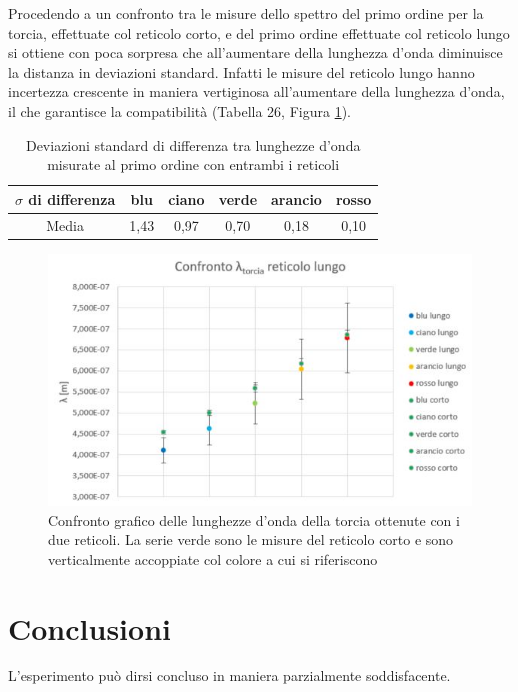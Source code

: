 \documentclass{article}
\begin{document}
Procedendo a un confronto tra le misure dello spettro del primo ordine per la torcia, effettuate col reticolo corto, e del primo ordine effettuate col reticolo lungo si ottiene con poca sorpresa che all'aumentare della lunghezza d'onda diminuisce la distanza in deviazioni standard. Infatti le misure del reticolo lungo hanno incertezza crescente in maniera vertiginosa all'aumentare della lunghezza d'onda, il che garantisce la compatibilità (Tabella 26, Figura \ref{confrontotraidue}).

\begin{table}[h]
    \centering
\begin{tabular}{||c|c|c|c|c|c||}
    \hline
     $\sigma$ di differenza & \cellcolor{blue}blu& \cellcolor{cyan}ciano  & \cellcolor{green}verde & \cellcolor{orange}arancio & \cellcolor{red}rosso \\
    \hline
    Media & 1,43 & 0,97 & 0,70 & 0,18 & 0,10 \\
    \hline
\end{tabular}
\caption{Deviazioni standard di differenza tra lunghezze d'onda misurate al primo ordine con entrambi i reticoli}
\end{table}

\begin{figure}
    \centering
    \includegraphics[width=0.6\linewidth]{Confronto_graph.JPG}
    \caption{Confronto grafico delle lunghezze d'onda della torcia ottenute con i due reticoli. La serie verde sono le misure del reticolo corto e sono verticalmente accoppiate col colore a cui si riferiscono}
    \label{confrontotraidue}
\end{figure}

\section{Conclusioni}

L'esperimento può dirsi concluso in maniera parzialmente soddisfacente.

\vspace{3mm}
\end{document}
